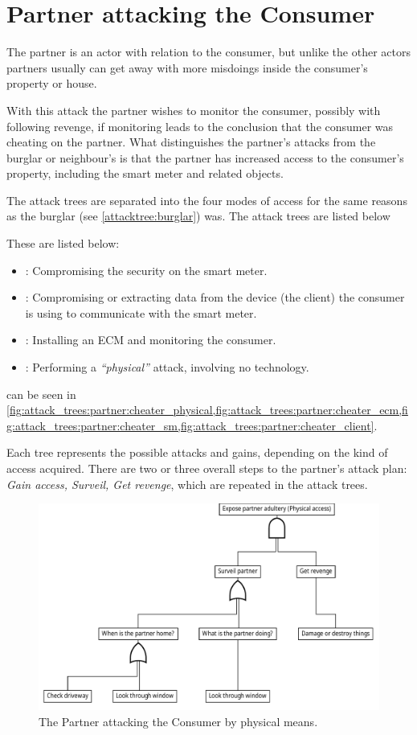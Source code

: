 
\section{Partner attacking the Consumer}
The partner is an actor with relation to the consumer, but unlike the other actors partners usually can get away with more misdoings inside the consumer's property or house.

With this attack the partner wishes to monitor the consumer, possibly with following revenge, if monitoring leads to the conclusion that the consumer was cheating on the partner.
What distinguishes the partner's attacks from the burglar or neighbour's is that the partner has increased access to the consumer's property, including the smart meter and related objects.

The attack trees are separated into the four modes of access for the same reasons as the burglar (see \cref{attacktree:burglar}) was.
The attack trees are listed below

These are listed below:
\begin{itemize}
  \item {}: Compromising the security on the smart meter.
  \item {}: Compromising or extracting data from the device (the client) the consumer is using to communicate with the smart meter.
  \item {}: Installing an ECM and monitoring the consumer.
  \item {}: Performing a \emph{``physical''} attack, involving no technology.
\end{itemize}
 can be seen in \cref{fig:attack_trees:partner:cheater_physical,fig:attack_trees:partner:cheater_ecm,fig:attack_trees:partner:cheater_sm,fig:attack_trees:partner:cheater_client}.

Each tree represents the possible attacks and gains, depending on the kind of access acquired.
There are two or three overall steps to the partner's attack plan: \textit{Gain access, Surveil, Get revenge}, which are repeated in the attack trees.

\begin{figure}[h]
  \centering
  \includegraphics[width=.75\textwidth]{figures/graphviz/partner_vs_consumer_physical.pdf}
  \caption{The Partner attacking the Consumer by physical means.}
  \label{fig:attack_trees:partner:cheater_physical}
\end{figure}

